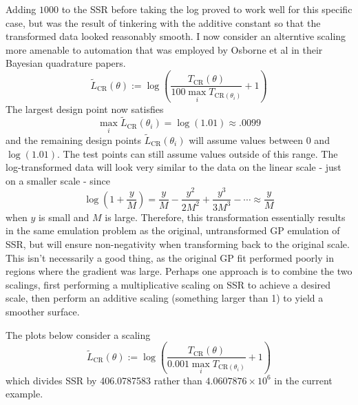\documentclass[
]{article}
\begin{document}
Adding \(1000\) to the SSR before taking the log proved to work well for
this specific case, but was the result of tinkering with the additive
constant so that the transformed data looked reasonably smooth. I now
consider an alterntive scaling more amenable to automation that was
employed by Osborne et al in their Bayesian quadrature papers.
\[\tilde{L}_{\text{CR}}(\theta) := \log\left(\frac{T_{\text{CR}}(\theta)}{100\max_{i} T_{\text{CR}(\theta_i)}} + 1\right)\]
The largest design point now satisfies
\[\max_i \tilde{L}_{\text{CR}}(\theta_i) = \log(1.01) \approx .0099\]
and the remaining design points \(\tilde{L}_{\text{CR}}(\theta_i)\) will
assume values between \(0\) and \(\log(1.01)\). The test points can
still assume values outside of this range. The log-transformed data will
look very similar to the data on the linear scale - just on a smaller
scale - since
\[\log\left(1 + \frac{y}{M}\right) = \frac{y}{M} - \frac{y^2}{2M^2} + \frac{y^3}{3M^3} - \cdots \approx \frac{y}{M}\]
when \(y\) is small and \(M\) is large. Therefore, this transformation
essentially results in the same emulation problem as the original,
untransformed GP emulation of SSR, but will ensure non-negativity when
transforming back to the original scale. This isn't necessarily a good
thing, as the original GP fit performed poorly in regions where the
gradient was large. Perhaps one approach is to combine the two scalings,
first performing a multiplicative scaling on SSR to achieve a desired
scale, then perform an additive scaling (something larger than 1) to
yield a smoother surface.

The plots below consider a scaling
\[\tilde{L}_{\text{CR}}(\theta) := \log\left(\frac{T_{\text{CR}}(\theta)}{0.001\max_{i} T_{\text{CR}(\theta_i)}} + 1\right)\]
which divides SSR by 406.0787583 rather than
\ensuremath{4.0607876\times 10^{6}} in the current example.
\end{document}
